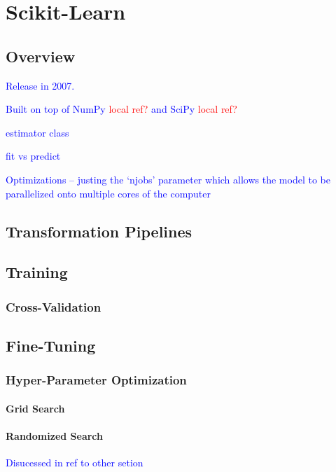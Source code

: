 \section{Scikit-Learn}

\subsection{Overview}

\textcolor{blue}{Release in 2007.}

\textcolor{blue}{Built on top of NumPy \textcolor{red}{local ref?} and SciPy \textcolor{red}{local ref?}}

\textcolor{blue}{estimator class}

\textcolor{blue}{fit vs predict}

\textcolor{blue}{Optimizations -- justing the `njobs' parameter which allows the model to be parallelized onto multiple cores of the computer}


\subsection{Transformation Pipelines}

\subsection{Training}

\subsubsection{Cross-Validation}

\subsection{Fine-Tuning}

\subsubsection{Hyper-Parameter Optimization}

\paragraph{Grid Search}

\paragraph{Randomized Search}

\textcolor{blue}{Disucessed in ref to other setion}